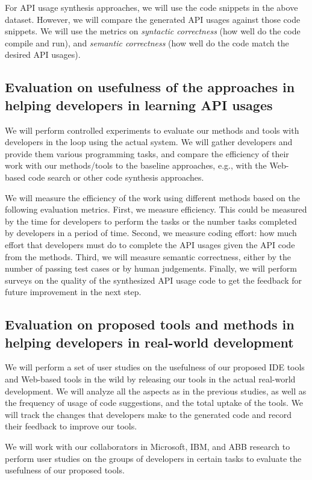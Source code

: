 For API usage synthesis approaches, we will use the code snippets in
the above dataset. However, we will compare the generated API usages
against those code snippets. We will use the metrics on {\em syntactic
correctness} (how well do the code compile and run), and {\em semantic
correctness} (how well do the code match the desired API usages).

\subsection{Evaluation on usefulness of the approaches in helping
developers in learning API usages}

We will perform controlled experiments to evaluate our methods and
tools with developers in the loop using the actual system. We will
gather developers and provide them various programming tasks, and
compare the efficiency of their work with our methods/tools to the
baseline approaches, e.g., with the Web-based code search or other
code synthesis approaches.

We will measure the efficiency of the work using different methods
based on the following evaluation metrics. First, we measure
efficiency. This could be measured by the time for developers to
perform the tasks or the number tasks completed by developers in a
period of time. Second, we measure coding effort: how much effort that
developers must do to complete the API usages given the API code from
the methods. Third, we will measure semantic correctness, either by
the number of passing test cases or by human judgements. Finally, we
will perform surveys on the quality of the synthesized API usage code
to get the feedback for future improvement in the next step.


\subsection{Evaluation on  proposed tools and methods in helping developers
in real-world development}

We will perform a set of user studies on the usefulness of our
proposed IDE tools and Web-based tools in the wild by releasing our
tools in the actual real-world development. We will analyze all the
aspects as in the previous studies, as well as the frequency of usage
of code suggestions, and the total uptake of the tools.  We will track
the changes that developers make to the generated code and record
their feedback to improve our tools.

We will work with our collaborators in Microsoft, IBM, and ABB research
to perform user studies on the groups of developers in certain tasks
to evaluate the usefulness of our proposed tools.
